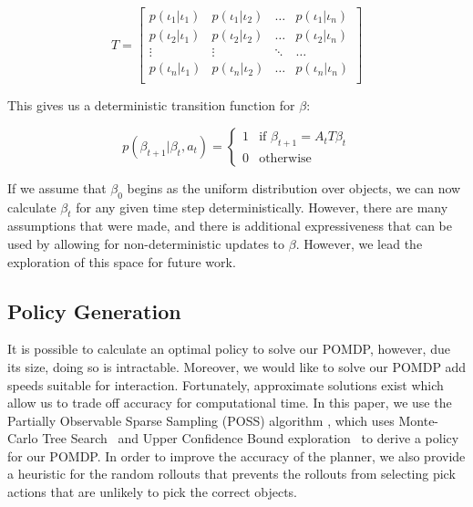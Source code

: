 \documentclass{article}
\begin{document}
\begin{multicols}{2}
\begin{equation}
	T = \left[\begin{matrix} 
			p(\iota_1 | \iota_1) & p(\iota_1| \iota_2)  & \ldots & p(\iota_1 | \iota_n) \\
			p(\iota_2 | \iota_1) & p(\iota_2 | \iota_2) & \ldots & p(\iota_2 | \iota_n) \\
			\vdots & \vdots & \ddots & \ldots  \\
			p(\iota_n | \iota_1) & p(\iota_n | \iota_2) & \ldots  &  p(\iota_n | \iota_n) \\
	\end{matrix}
\right]
\end{equation}

This gives us a deterministic transition function for $\beta$: 

\begin{equation}
	p(\beta_{t+1} | \beta_t, a_t) = \begin{cases}
		1 & \text{if } \beta_{t+1} = A_t T \beta_t \\
		0 & \text{otherwise}
	\end{cases}
\end{equation}

If we assume that $\beta_0$ begins as the uniform distribution over objects, we can now calculate $\beta_t$ for any given time step deterministically. However, there are many assumptions that were made, and there is additional expressiveness that can be used by allowing for non-deterministic updates to $\beta$. However, we lead the exploration of this space for future work. 

\subsection{Policy Generation}

It is possible to calculate an optimal policy to solve our POMDP, however, due its size, doing so is intractable. Moreover, we would like to solve our POMDP add speeds suitable for interaction. Fortunately, approximate solutions exist which allow us to trade off accuracy for computational time. In this paper, we use the Partially Observable Sparse Sampling (POSS) algorithm \citep{Gopalan2016}, which uses Monte-Carlo Tree Search~\citep{coulom2006efficient} and Upper Confidence Bound exploration~\citep{kocsis2006bandit} to derive a policy for our POMDP. In order to improve the accuracy of the planner, we also provide a heuristic for the random rollouts that prevents the rollouts from selecting pick actions that are unlikely to pick the correct objects. 


\end{multicols}
\end{document}
